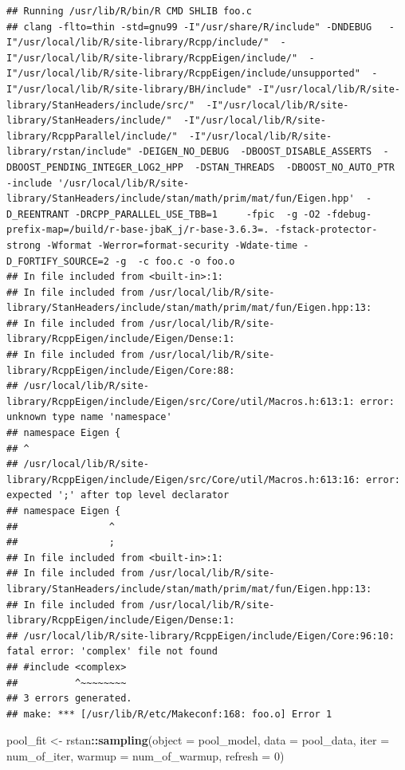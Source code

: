 \documentclass[
]{article}
\newenvironment{Shaded}{\begin{snugshade}}{\end{snugshade}}
\newcommand{\DataTypeTok}[1]{\textcolor[rgb]{0.13,0.29,0.53}{#1}}
\newcommand{\DecValTok}[1]{\textcolor[rgb]{0.00,0.00,0.81}{#1}}
\newcommand{\KeywordTok}[1]{\textcolor[rgb]{0.13,0.29,0.53}{\textbf{#1}}}
\newcommand{\NormalTok}[1]{#1}
\newcommand{\OperatorTok}[1]{\textcolor[rgb]{0.81,0.36,0.00}{\textbf{#1}}}
\newcommand{\StringTok}[1]{\textcolor[rgb]{0.31,0.60,0.02}{#1}}
\begin{document}
\begin{verbatim}
## Running /usr/lib/R/bin/R CMD SHLIB foo.c
## clang -flto=thin -std=gnu99 -I"/usr/share/R/include" -DNDEBUG   -I"/usr/local/lib/R/site-library/Rcpp/include/"  -I"/usr/local/lib/R/site-library/RcppEigen/include/"  -I"/usr/local/lib/R/site-library/RcppEigen/include/unsupported"  -I"/usr/local/lib/R/site-library/BH/include" -I"/usr/local/lib/R/site-library/StanHeaders/include/src/"  -I"/usr/local/lib/R/site-library/StanHeaders/include/"  -I"/usr/local/lib/R/site-library/RcppParallel/include/"  -I"/usr/local/lib/R/site-library/rstan/include" -DEIGEN_NO_DEBUG  -DBOOST_DISABLE_ASSERTS  -DBOOST_PENDING_INTEGER_LOG2_HPP  -DSTAN_THREADS  -DBOOST_NO_AUTO_PTR  -include '/usr/local/lib/R/site-library/StanHeaders/include/stan/math/prim/mat/fun/Eigen.hpp'  -D_REENTRANT -DRCPP_PARALLEL_USE_TBB=1     -fpic  -g -O2 -fdebug-prefix-map=/build/r-base-jbaK_j/r-base-3.6.3=. -fstack-protector-strong -Wformat -Werror=format-security -Wdate-time -D_FORTIFY_SOURCE=2 -g  -c foo.c -o foo.o
## In file included from <built-in>:1:
## In file included from /usr/local/lib/R/site-library/StanHeaders/include/stan/math/prim/mat/fun/Eigen.hpp:13:
## In file included from /usr/local/lib/R/site-library/RcppEigen/include/Eigen/Dense:1:
## In file included from /usr/local/lib/R/site-library/RcppEigen/include/Eigen/Core:88:
## /usr/local/lib/R/site-library/RcppEigen/include/Eigen/src/Core/util/Macros.h:613:1: error: unknown type name 'namespace'
## namespace Eigen {
## ^
## /usr/local/lib/R/site-library/RcppEigen/include/Eigen/src/Core/util/Macros.h:613:16: error: expected ';' after top level declarator
## namespace Eigen {
##                ^
##                ;
## In file included from <built-in>:1:
## In file included from /usr/local/lib/R/site-library/StanHeaders/include/stan/math/prim/mat/fun/Eigen.hpp:13:
## In file included from /usr/local/lib/R/site-library/RcppEigen/include/Eigen/Dense:1:
## /usr/local/lib/R/site-library/RcppEigen/include/Eigen/Core:96:10: fatal error: 'complex' file not found
## #include <complex>
##          ^~~~~~~~~
## 3 errors generated.
## make: *** [/usr/lib/R/etc/Makeconf:168: foo.o] Error 1
\end{verbatim}

\begin{Shaded}
\begin{Highlighting}[]
\NormalTok{pool\_fit \textless{}{-}}\StringTok{ }\NormalTok{rstan}\OperatorTok{::}\KeywordTok{sampling}\NormalTok{(}\DataTypeTok{object =}\NormalTok{ pool\_model,}
                            \DataTypeTok{data =}\NormalTok{ pool\_data,}
                            \DataTypeTok{iter =}\NormalTok{ num\_of\_iter,}
                            \DataTypeTok{warmup =}\NormalTok{ num\_of\_warmup,}
                            \DataTypeTok{refresh =} \DecValTok{0}\NormalTok{)}
\end{Highlighting}
\end{Shaded}
\end{document}
